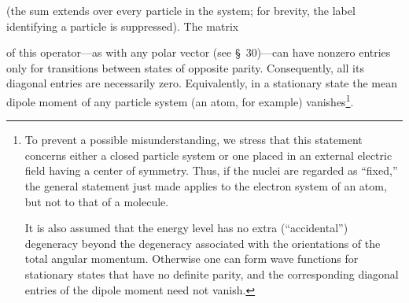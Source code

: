 (the sum extends over every particle in the system; for brevity, the label identifying a particle is suppressed). The matrix

of this operator---as with any polar vector (see \S~30)---can have nonzero entries only for transitions between states of opposite parity. Consequently, all its diagonal entries are necessarily zero. Equivalently, in a stationary state the mean dipole moment of any particle system (an atom, for example) vanishes\footnote{To prevent a possible misunderstanding, we stress that this statement concerns either a closed particle system or one placed in an external electric field having a center of symmetry. Thus, if the nuclei are regarded as ``fixed,'' the general statement just made applies to the electron system of an atom, but not to that of a molecule.

It is also assumed that the energy level has no extra (``accidental'') degeneracy beyond the degeneracy associated with the orientations of the total angular momentum. Otherwise one can form wave functions for stationary states that have no definite parity, and the corresponding diagonal entries of the dipole moment need not vanish.}.
